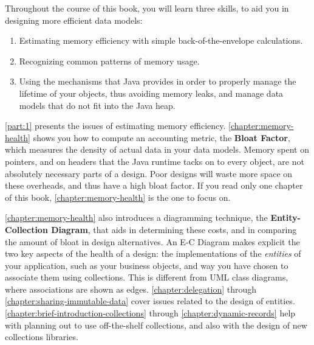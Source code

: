 Throughout the course of this book, you will learn three skills, to aid you in
designing more efficient data models:
\begin{enumerate}
  \item Estimating memory efficiency with simple back-of-the-envelope
  calculations.
  \item Recognizing common patterns of memory usage.
  \item Using the mechanisms that Java provides in order to properly manage the
  lifetime of your objects, thus avoiding memory leaks, and manage data models
  that do not fit into the Java heap.
\end{enumerate} 



\autoref{part:1} presents the issues of estimating memory efficiency.
\autoref{chapter:memory-health} shows you how to compute an accounting metric,
the \textbf{Bloat Factor}, which measures the density of actual data in your
data models. Memory spent on pointers, and on headers that the Java runtime
tacks on to every object, are not absolutely necessary parts of a design. Poor
designs will waste more space on these overheads, and thus have a high bloat
factor. If you read only one chapter of this book,
\autoref{chapter:memory-health} is the one to focus on.

\autoref{chapter:memory-health} also introduces a diagramming technique, the
\textbf{Entity-Collection Diagram}, that aids in determining these costs, and in
comparing the amount of bloat in design alternatives.
An E-C Diagram makes explicit the two key aspects of the health of a design:
the implementations of the \emph{entities} of your application, such as your
business objects, and way you have chosen to associate them using collections.
This is different from UML class diagrams, where associations are shown as
edges.
\autoref{chapter:delegation} through
\autoref{chapter:sharing-immutable-data} cover issues related to the design of
entities.
\autoref{chapter:brief-introduction-collections} through
\autoref{chapter:dynamic-records} help with planning out to use off-the-shelf
collections, and also with the design of new collections libraries.

